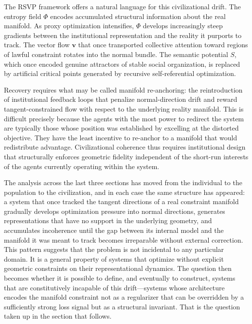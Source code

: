 \documentclass[11pt,a4paper,twocolumn]{article}
\begin{document}
The RSVP framework offers a natural language for this
civilizational drift. The entropy field $\Phi$ encodes
accumulated structural information about the real manifold.
As proxy optimization intensifies, $\Phi$ develops
increasingly steep gradients between the institutional
representation and the reality it purports to track.
The vector flow $\mathbf{v}$ that once transported
collective attention toward regions of lawful constraint
rotates into the normal bundle. The semantic potential $S$,
which once encoded genuine attractors of stable social
organization, is replaced by artificial critical points
generated by recursive self-referential optimization.

Recovery requires what may be called manifold re-anchoring:
the reintroduction of institutional feedback loops that
penalize normal-direction drift and reward tangent-constrained
flow with respect to the underlying reality manifold. This is
difficult precisely because the agents with the most power
to redirect the system are typically those whose position
was established by excelling at the distorted objective.
They have the least incentive to re-anchor to a manifold
that would redistribute advantage. Civilizational coherence
thus requires institutional design that structurally enforces
geometric fidelity independent of the short-run interests
of the agents currently operating within the system.

The analysis across the last three sections has moved from
the individual to the population to the civilization, and in
each case the same structure has appeared: a system that once
tracked the tangent directions of a real constraint manifold
gradually develops optimization pressure into normal
directions, generates representations that have no support
in the underlying geometry, and accumulates incoherence until
the gap between its internal model and the manifold it was
meant to track becomes irreparable without external correction.
This pattern suggests that the problem is not incidental to
any particular domain. It is a general property of systems
that optimize without explicit geometric constraints on
their representational dynamics. The question then becomes
whether it is possible to define, and eventually to
construct, systems that are constitutively incapable of
this drift---systems whose architecture encodes the manifold
constraint not as a regularizer that can be overridden by
a sufficiently strong loss signal but as a structural invariant.
That is the question taken up in the section that follows.
\end{document}

